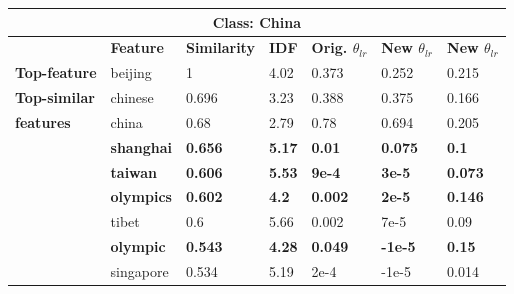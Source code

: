 \begin{table}[htbp]
\centering
\begin{tabular}{lllllll}
\multicolumn{7}{c}{\textbf{Class: China}} \\ \hline
\multicolumn{1}{l|}{\textbf{}} & \multicolumn{1}{l|}{\textbf{Feature}} & \multicolumn{1}{l|}{\textbf{Similarity}} & \multicolumn{1}{l|}{\textbf{IDF}} & \multicolumn{1}{l|}{\textbf{Orig. $\theta_{lr}$}} & \multicolumn{1}{l|}{\textbf{New $\theta_{lr}$}} & \textbf{New $\theta_{lr}$} \\ \hline
\multicolumn{1}{l|}{\textbf{Top-feature}} & \multicolumn{1}{l|}{beijing} & \multicolumn{1}{l|}{1} & \multicolumn{1}{l|}{4.02} & \multicolumn{1}{l|}{0.373} & \multicolumn{1}{l|}{0.252} & 0.215 \\ \hline
\multicolumn{1}{l|}{\textbf{Top-similar}} & \multicolumn{1}{l|}{chinese} & \multicolumn{1}{l|}{0.696} & \multicolumn{1}{l|}{3.23} & \multicolumn{1}{l|}{0.388} & \multicolumn{1}{l|}{0.375} & 0.166 \\
\multicolumn{1}{l|}{\textbf{features}} & \multicolumn{1}{l|}{china} & \multicolumn{1}{l|}{0.68} & \multicolumn{1}{l|}{2.79} & \multicolumn{1}{l|}{0.78} & \multicolumn{1}{l|}{0.694} & 0.205 \\
\multicolumn{1}{l|}{} & \multicolumn{1}{l|}{\textbf{shanghai}} & \multicolumn{1}{l|}{\textbf{0.656}} & \multicolumn{1}{l|}{\textbf{5.17}} & \multicolumn{1}{l|}{\textbf{0.01}} & \multicolumn{1}{l|}{\textbf{0.075}} & \textbf{0.1} \\
\multicolumn{1}{l|}{\textbf{}} & \multicolumn{1}{l|}{\textbf{taiwan}} & \multicolumn{1}{l|}{\textbf{0.606}} & \multicolumn{1}{l|}{\textbf{5.53}} & \multicolumn{1}{l|}{\textbf{9e-4}} & \multicolumn{1}{l|}{\textbf{3e-5}} & \textbf{0.073} \\
\multicolumn{1}{l|}{} & \multicolumn{1}{l|}{\textbf{olympics}} & \multicolumn{1}{l|}{\textbf{0.602}} & \multicolumn{1}{l|}{\textbf{4.2}} & \multicolumn{1}{l|}{\textbf{0.002}} & \multicolumn{1}{l|}{\textbf{2e-5}} & \textbf{0.146} \\
\multicolumn{1}{l|}{} & \multicolumn{1}{l|}{tibet} & \multicolumn{1}{l|}{0.6} & \multicolumn{1}{l|}{5.66} & \multicolumn{1}{l|}{0.002} & \multicolumn{1}{l|}{7e-5} & 0.09 \\
\multicolumn{1}{l|}{\textbf{}} & \multicolumn{1}{l|}{\textbf{olympic}} & \multicolumn{1}{l|}{\textbf{0.543}} & \multicolumn{1}{l|}{\textbf{4.28}} & \multicolumn{1}{l|}{\textbf{0.049}} & \multicolumn{1}{l|}{\textbf{-1e-5}} & \textbf{0.15} \\
\multicolumn{1}{l|}{} & \multicolumn{1}{l|}{singapore} & \multicolumn{1}{l|}{0.534} & \multicolumn{1}{l|}{5.19} & \multicolumn{1}{l|}{2e-4} & \multicolumn{1}{l|}{-1e-5} & 0.014 \\

\end{tabular}
\end{table}
